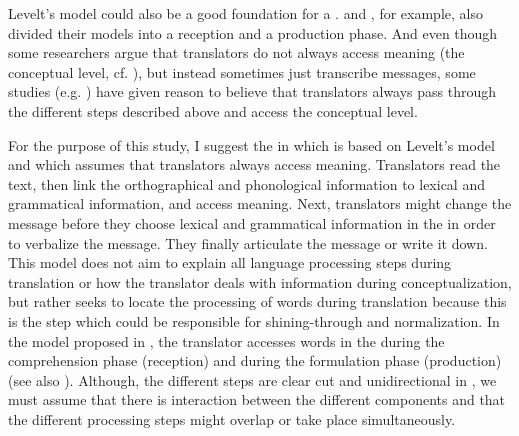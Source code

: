 \documentclass[output=paper]{LSP/langsci}
\begin{document}
Levelt's model could also be a good foundation for a . \citet{Kautz2000} and \citet{Steiner2001Translations}, for example, also divided their  models into a reception and a production phase. And even though some researchers argue that translators do not always access meaning (the conceptual level, cf. \citealt{DeGroot2011}), but instead sometimes just transcribe messages, some studies (e.g. \citealt{Francis2005}) have given reason to believe that translators always pass through the different steps described above and access the conceptual level.

For the purpose of this study, I suggest the  in  which is based on Levelt's model and which assumes that translators always access meaning. Translators read the text, then link the orthographical and phonological information to lexical and grammatical information, and access meaning. Next, translators might change the message before they choose lexical and grammatical information in the  in order to verbalize the message. They finally articulate the message or write it down. This model does not aim to explain all language processing steps during translation or how the translator deals with information during conceptualization, but rather seeks to locate the processing of words during translation because this is the step which could be responsible for shining-through and normalization. In the model proposed in , the translator accesses words in the  during the comprehension phase (reception) and during the formulation phase (production) (see also \citealt{Levelt1989}). Although, the different steps are clear cut and unidirectional in , we must assume that there is interaction between the different components and that the different processing steps might overlap or take place simultaneously.
\end{document}

